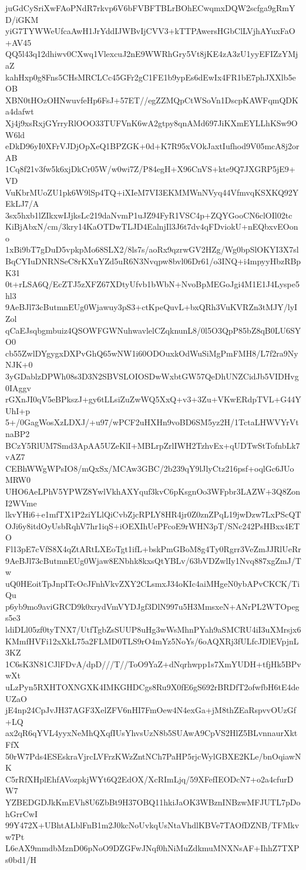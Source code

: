 juGdCySriXwFAoPNdR7rkvp6V6bFVBFTBLrBOhECwqmxDQW2scfga9gRmYD/iGKM
yiG7TYWWeUfcaAwH1JrYddIJWBvIjCVV3+kTTPAwersHGbClLVjhAYuxFaO+AV45
QQ5l43q12dhiwv0CXwq1VlexcuJ2nE9WWRhGry5Vt8jKE4zA3zU1yyEFIZzYMjaZ
kahHxp0g8Fns5CHsMRCLCc45GFr2gC1FE1b9ypEs6dEwIx4FR1bE7phJXXlb5eOB
XBN0tHOzOHNwuvfeHp6FsJ+57ET//egZZMQpCtWSoVn1DscpKAWFqmQDKa4dafwt
Xj4j9xsRxjGYrryRlOOO33TUFVnK6wA2gtpy8qnAMd697JiKXmEYLLhKSw9OW6ld
eDkD96yI0XFrVJDjOpXeQ1BPZGK+0d+K7R95xVOkJaxtIufhod9V05mcA8j2orAB
1Cq8f21v3fw5k6xjDkCr05W/w0wi7Z/P84egH+X96CnVS+kte9Q7JXGRP5jE9+VD
VuKbrMUoZU1pk6W9lSp4TQ+iXIeM7VI3EKMMWnNVyq44VfmvqKSXKQ92YEkLJ7/A
3sx5hxb1lZIkxwIJjksLc219daNvmP1uJZ94FyR1VSC4p+ZQYGooCN6clOIl02tc
KiBjAbxN/cm/3kry14KaOTDwTLJD4EalnjIl3J6t7dv4qFDviokU+nEQbxvEOono
1xBi9bT7gDuD5vpkpMo68SLX2/8ls7s/aoRx9qzrwGV2HZg/Wg0bpSlOKYI3X7sl
BqCYIuDNRNSeC8rKXuYZd5uR6N3Nvqpw8bvl06Dr61/o3INQ+i4mpyyHbzRBpK31
0t+rLSA6Q/EcZTJ5zXFZ67XDtyUfvb1bWbN+NvoBpMEGoJgi4M1E1J4Lyspe5hl3
9AeBJl73cButmnEUg0Wjawuy3pS3+ctKpeQuvL+bxQRh3VuKVRZn3tMJY/lyIZol
qCaEJsqbgmbuiz4QSOWFGWNuhwavlelCZqknunL8/0l5O3QpP85bZ8qB0LU6SYO0
cb55ZwlDYgygxDXPvGhQ65wNW1i60ODOuxkOdWuSiMgPmFMH8/L7f2ra9NyNJK+0
3yGDablzDPWh08s3D3N2SBVSLOIOSDwWxbtGW57QeDhUNZCidJb5VIDHvg0IAggv
rGXnJI0qV5eBPkszJ+gy6tLLsiZuZwWQ5XxQ+v3+3Zu+VKwERdpTVL+G44YUhI+p
5+/0GagWosXzLDXJ/+u97/wPCF2uHXHn9voBD6SM5yz2H/1TctaLHWVYrVtnaBP2
BCzY5RlUM7Smd3ApAA5UZeKlI+MBLrpZrlIWH2TzhvEx+qUDTwStTofnbLk7vAZ7
CEBhWWgWPsIO8/mQxSx/MCAw3GBC/2b239qY9lJlyCtz216psf+oqlGc6JUoMRW0
UHO6AeLPhV5YPWZ8YwlVkhAXYquf3kvC6pKsgnOo3WFpbr3LAZW+3Q8ZonI2WVme
lkvYHi6+e1mfTX1P2ziYLlQiCvbZjcRPLY8HR4jr0Z0znZPqL19jwDzw7LxPScQT
OJi6y8itdOyUsbRqhV7hr1iqS+iOEXIhUePFcoE9rWHN3pT/SNc242PsHBxx4ETO
Fl13pE7cVfS8X4qZtARtLXEoTgt1ifL+bskPmGBoM8g4Ty0Rgrr3VeZmJJRlUeRr
9AeBJl73cButmnEUg0Wjaw8ENbhk8kxsQtYBLv/63bVDZwlIy1Nvq887xgZmJ/Tw
uQ0HEoitTpJnpITcOcJFnhVkvZXY2CLsmxJ34oKIc4aiMHgeN0ybAPvCKCK/TiQu
p6yb9mo9aviGRCD9k0xrydVmVYDJgf3DlN997u5H3MmsxeN+ANrPL2WTOpegs5e3
ldiDLl05zf0tyTNX7/UtfTgbZsSUUP8uHg3wWsMhnPYah9aSMCRU4iI3uXMrsjx6
KMmfHVFi12xXkL75a2FLMD0TLS9rO4mYz5NoYs/6oAQXRj3fULfcJDlEVpjnL3KZ
1C6sK3N81CJlFDvA/dpD///T//ToO9YaZ+dNqrhwpp1s7XmYUDH+tfjHk5BPvwXt
uLzPyn5RXHTOXNGXK4IMKGHDCgs8Ru9X0fE6gS692rBRDfT2ofwfbH6tE4deUZaO
jE4np24CpJvJH37AGF3XelZFV6nHI7FmOew4N4exGa+jM8thZEaRspvvOUzGf+LQ
ax2qR6qYVL4yyxNeMhQXqfIUsYhvsUzN8b5SUAwA9CpVS2HlZ5BLvnnaurXktFfX
50rW7Pds4ESEskraVjrcLVFrzKWzZntNCh7PaHP5rjcWylGBXE2KLe/bnOqiawNK
C5rRfXHplEhfAVozpkjWYt6Q2EdOX/XcRImLjq/59XFefIEODcN7+o2a4cfurDW7
YZBEDGDJkKmEVh8U6ZbBt9H37OBQ11hkiJaOK3WBznINBzwMFJUTL7pDohGrrCwI
99Y472X+UBhtALblFnB1m2J0kcNoUvkqUsNtaVhdlKBVe7TAOfDZNB/TFMkvw7Pt
L6eAX9mmdbMznD06pNoO9DZGFwJNqf0hNiMuZdkmuMNXNsAF+IhhZ7TXPs0bd1/H
